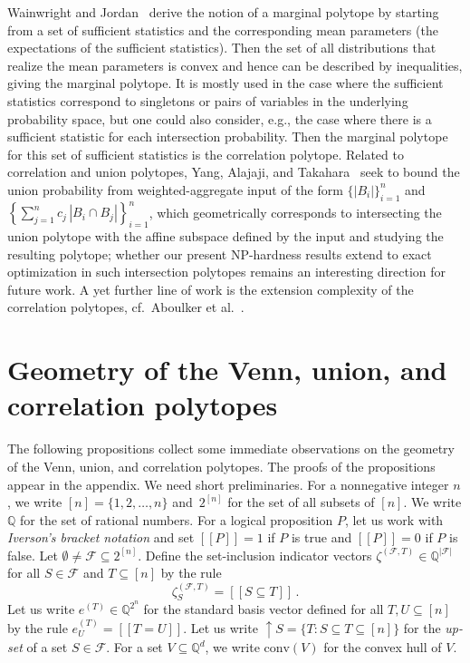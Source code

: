 \documentclass[11pt]{article}
\newcommand{\iv}[1]{\ensuremath{[\![{#1}]\!]}}
\newcommand{\conv}{\text{conv}}
\begin{document}
Wainwright and Jordan~\cite{WainwrightJ2008} derive the notion of a marginal polytope by starting from a set of sufficient statistics and the corresponding mean parameters (the expectations of the sufficient statistics). Then the set of all distributions that realize the mean parameters is convex and hence can be described by inequalities, giving the marginal polytope. It is mostly used in the case where the sufficient statistics correspond to singletons or pairs of variables in the underlying probability space, but one could also consider, e.g., the case where there is a sufficient statistic for each intersection probability. Then the marginal polytope for this set of sufficient statistics is the correlation polytope. Related to correlation and union polytopes, Yang, Alajaji, and Takahara~\cite{YangAT2015} seek to bound the union probability from weighted-aggregate input of the form $\{|B_i|\}_{i=1}^n$ and $\left\{\sum_{j=1}^n c_j\,|B_i\cap B_j|\right\}_{i=1}^n$, which geometrically corresponds to intersecting the union polytope with the affine subspace defined by the input and studying the resulting polytope; whether our present NP-hardness results extend to exact optimization in such intersection polytopes remains an interesting direction for future work. A yet further line of work is the extension complexity of the correlation polytopes, cf.~Aboulker et al.~\cite{AboulkerFHMS2019}. 


\section{Geometry of the Venn, union, and correlation polytopes}

\label{sect:preliminaries}

The following propositions collect some immediate observations 
on the geometry of the Venn, union, and correlation polytopes. 
The proofs of the propositions appear in the appendix.
We need short preliminaries.
For a nonnegative integer $n$, 
we write $[n]=\{1,2,\ldots,n\}$ and~$2^{[n]}$ 
for the set of all subsets of $[n]$.
We write $\mathbb{Q}$ for the set of rational numbers. 
For a logical proposition $P$, let us work with 
{\em Iverson's bracket notation} and set $\iv{P}=1$ if $P$ is true 
and $\iv{P}=0$ if $P$ is false. 
Let $\emptyset\neq\mathcal{F}\subseteq 2^{[n]}$. 
Define the set-inclusion indicator 
vectors $\zeta^{(\mathcal{F},T)}\in\mathbb{Q}^{|\mathcal{F}|}$ for all 
$S\in\mathcal{F}$ and $T\subseteq [n]$ by the rule 
\begin{equation}
\label{eq:set-inclusion-indicator}
\zeta^{(\mathcal{F},T)}_S=\iv{S\subseteq T}\,.
\end{equation}
Let us write $e^{(T)}\in\mathbb{Q}^{2^n}$ for the standard basis vector defined 
for all $T,U\subseteq[n]$ by the rule $e^{(T)}_U=\iv{T=U}$.
Let us write 
$\uparrow\!S=\{T:S\subseteq T\subseteq [n]\}$ for the {\em up-set} of a set
$S\in\mathcal{F}$. For a set $V\subseteq\mathbb{Q}^d$, we write $\conv(V)$ for
the convex hull of $V$.
\end{document}
